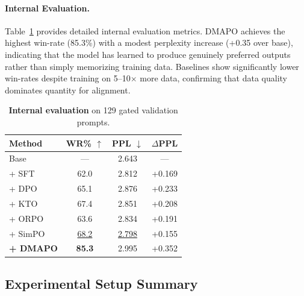 \documentclass[10pt,twocolumn]{article}
\newcommand{\ours}{\textsc{DMAPO}}
\newcommand{\best}[1]{\textbf{#1}}
\newcommand{\second}[1]{\underline{#1}}
\newcommand{\up}{$\uparrow$}
\newcommand{\down}{$\downarrow$}
\begin{document}

\paragraph{Internal Evaluation.}
Table~\ref{tab:internal_eval} provides detailed internal evaluation metrics.
\ours{} achieves the highest win-rate (85.3\%) with a modest perplexity increase (+0.35 over base), indicating that the model has learned to produce genuinely preferred outputs rather than simply memorizing training data.
Baselines show significantly lower win-rates despite training on 5--10$\times$ more data, confirming that data quality dominates quantity for alignment.

\begin{table}[t]
\centering
\caption{\textbf{Internal evaluation} on 129 gated validation prompts.}
\label{tab:internal_eval}
\vspace{0.5em}
\begin{tabular}{l ccc}
\toprule
\textbf{Method} & \textbf{WR\%} \up{} & \textbf{PPL} \down{} & $\Delta$\textbf{PPL} \\
\midrule
Base       & ---  & 2.643 & --- \\
+ SFT      & 62.0 & 2.812 & +0.169 \\
+ DPO      & 65.1 & 2.876 & +0.233 \\
+ KTO      & 67.4 & 2.851 & +0.208 \\
+ ORPO     & 63.6 & 2.834 & +0.191 \\
+ SimPO    & \second{68.2} & \second{2.798} & +0.155 \\
\midrule
\textbf{+ \ours{}} & \best{85.3} & 2.995 & +0.352 \\
\bottomrule
\end{tabular}
\end{table}



\subsection{Experimental Setup Summary}
\end{document}
